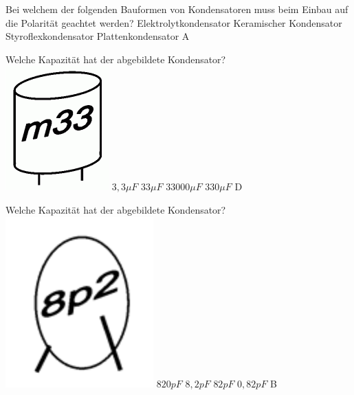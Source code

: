 {Bei welchem der folgenden Bauformen von
Kondensatoren muss beim Einbau auf die
Polarität geachtet werden?}%
{Elektrolytkondensator}%
{Keramischer Kondensator}%
{Styroflexkondensator}%
{Plattenkondensator}%
{A}%

{Welche Kapazität hat der abgebildete Kondensator?\\
\includegraphics[scale=0.3]{Kondensator/Bilder/TC203.png}
}%
{$3,3\mu F$}%
{$33\mu F$}%
{$33000\mu F$}%
{$330\mu F$}%
{D}%

{Welche Kapazität hat der abgebildete Kondensator?\\
\includegraphics[scale=0.9]{Kondensator/Bilder/TC205.png}
}%
{$820pF$}%
{$8,2pF$}%
{$82pF$}%
{$0,82pF$}%
{B}%